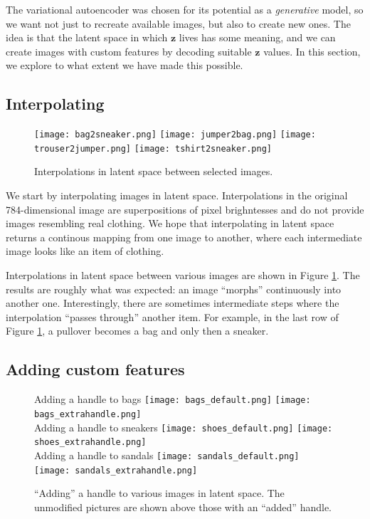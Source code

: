 \documentclass[]{article}
\begin{document}
\hspace{\parindent} The variational autoencoder was chosen for its potential as a \textit{generative} model, so we want not just to recreate available images, but also to create new ones. The idea is that the latent space in which $\bm{z}$ lives has some meaning, and we can create images with custom features by decoding suitable $\bm{z}$ values. In this section, we explore to what extent we have made this possible.


\subsection{Interpolating}
\label{sec:generating:interpolating}

\begin{figure}
  \centering
  \texttt{[image: bag2sneaker.png]}
  \texttt{[image: jumper2bag.png]}
  \texttt{[image: trouser2jumper.png]}
  \texttt{[image: tshirt2sneaker.png]}
  \caption{Interpolations in latent space between selected images.}
  \label{fig:interpolations}
\end{figure}

\hspace{\parindent} We start by interpolating images in latent space. Interpolations in the original 784-dimensional image are superpositions of pixel brighntesses and do not provide images resembling real clothing. We hope that interpolating in latent space returns a continous mapping from one image to another, where each intermediate image looks like an item of clothing.

Interpolations in latent space between various images are shown in Figure \ref{fig:interpolations}. The results are roughly what was expected: an image ``morphs'' continuously into another one. Interestingly, there are sometimes intermediate steps where the interpolation ``passes through'' another item. For example, in the last row of Figure \ref{fig:interpolations}, a pullover becomes a bag and only then a sneaker.


\subsection{Adding custom features}
\label{sec:generating:features}

\begin{figure}
  \centering
  Adding a handle to bags
  \texttt{[image: bags\_default.png]}
  \texttt{[image: bags\_extrahandle.png]} \\
  Adding a handle to sneakers
  \texttt{[image: shoes\_default.png]}
  \texttt{[image: shoes\_extrahandle.png]} \\
  Adding a handle to sandals
  \texttt{[image: sandals\_default.png]}
  \texttt{[image: sandals\_extrahandle.png]}
  \caption{``Adding'' a handle to various images in latent space. The unmodified pictures are shown above those with an ``added'' handle.}
  \label{fig:extrahandles}
\end{figure}
\end{document}
